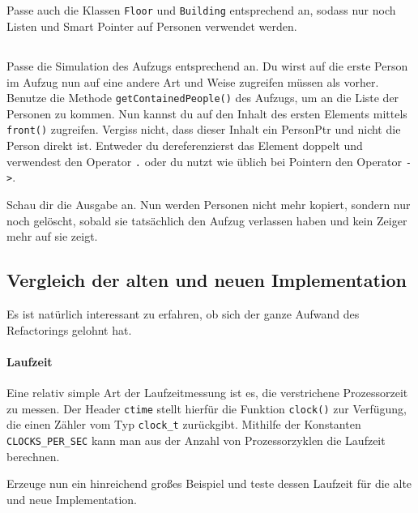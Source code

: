 \subsection{}
Passe auch die Klassen \lstinline{Floor} und \lstinline{Building} entsprechend an, sodass nur noch Listen und Smart Pointer auf Personen verwendet werden.

\subsection{}
Passe die Simulation des Aufzugs entsprechend an.
Du wirst auf die erste Person im Aufzug nun auf eine andere Art und Weise zugreifen müssen als vorher.
Benutze die Methode \lstinline{getContainedPeople()} des Aufzugs, um an die Liste der Personen zu kommen.
Nun kannst du auf den Inhalt des ersten Elements mittels \lstinline{front()} zugreifen.
Vergiss nicht, dass dieser Inhalt ein PersonPtr und nicht die Person direkt ist.
Entweder du dereferenzierst das Element doppelt und verwendest den Operator \lstinline{.} oder du nutzt wie üblich bei Pointern den Operator \lstinline{->}.

Schau dir die Ausgabe an.
Nun werden Personen nicht mehr kopiert, sondern nur noch gelöscht, sobald sie tatsächlich den Aufzug verlassen haben und kein Zeiger mehr auf sie zeigt.

\subsection{Vergleich der alten und neuen Implementation \optional}
\optionaltextbox

Es ist natürlich interessant zu erfahren, ob sich der ganze Aufwand des Refactorings gelohnt hat.

\paragraph{Laufzeit}
Eine relativ simple Art der Laufzeitmessung ist es, die verstrichene Prozessorzeit zu messen.
Der Header \lstinline{ctime} stellt hierfür die Funktion \lstinline{clock()} zur Verfügung, die einen Zähler vom Typ \lstinline{clock_t} zurückgibt.
Mithilfe der Konstanten \lstinline{CLOCKS_PER_SEC} kann man aus der Anzahl von Prozessorzyklen die Laufzeit berechnen.

Erzeuge nun ein hinreichend großes Beispiel und teste dessen Laufzeit für die alte und neue Implementation.



